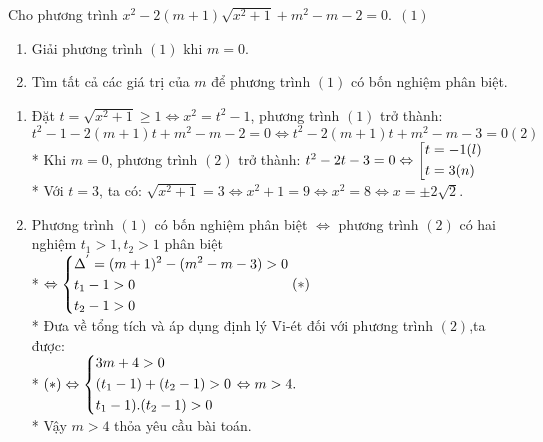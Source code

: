 \begin{ex}%
    Cho phương trình $x^{2}-2(m+1)\sqrt{x^{2}+1}+m^{2}-m-2=0.  \ \ (1)$
    \begin{enumerate}
        \item Giải phương trình $(1)$ khi $m=0$.
        \item Tìm tất cả các giá trị của $m$ để phương trình $(1)$ có bốn nghiệm phân biệt.
    \end{enumerate}
\loigiai
    {
    \begin{enumerate}
        \item Đặt $t=\sqrt{x^{2}+1}\geq 1 \Leftrightarrow x^{2}=t^{2}-1$, phương trình $(1)$ trở thành:
          $t^{2}-1-2(m+1)t+m^{2}-m-2=0 \Leftrightarrow t^{2}-2(m+1)t+m^{2}-m-3=0    (2)$\\*
        Khi $m=0$, phương trình $(2)$ trở thành:  $t^{2}-2t-3=0 \Leftrightarrow \left[\begin{aligned}&t=-1 (l)\\ &t=3 (n)\end{aligned}\right.$ \\*
            Với $t=3$, ta có: $\sqrt{x^{2}+1}=3\Leftrightarrow x^{2}+1=9 \Leftrightarrow x^{2}=8 \Leftrightarrow x=\pm2\sqrt{2}$.
        \item Phương trình $(1)$ có bốn nghiệm phân biệt $\Leftrightarrow$ phương trình $(2)$ có hai nghiệm $t_{1}>1,t_{2}>1$ phân biệt \\*
          $\Leftrightarrow \left\{\begin{aligned}&\Delta^{'}=(m+1)^{2}-(m^{2}-m-3)>0\\ &t_{1}-1>0\\ &t_{2}-1>0\end{aligned}\right.   (*)$ \\*
           Đưa về tổng tích và áp dụng định lý Vi-ét đối với phương trình $(2)$,ta được:\\*
           $(*)\Leftrightarrow \left\{\begin{aligned}&3m+4>0\\ &(t_{1}-1)+(t_{2}-1)>0\\ &t_{1}-1).(t_{2}-1)>0\end{aligned}\right. \Leftrightarrow m>4.$\\*
           Vậy $m>4$ thỏa yêu cầu bài toán.
    \end{enumerate}
    }
\end{ex}

